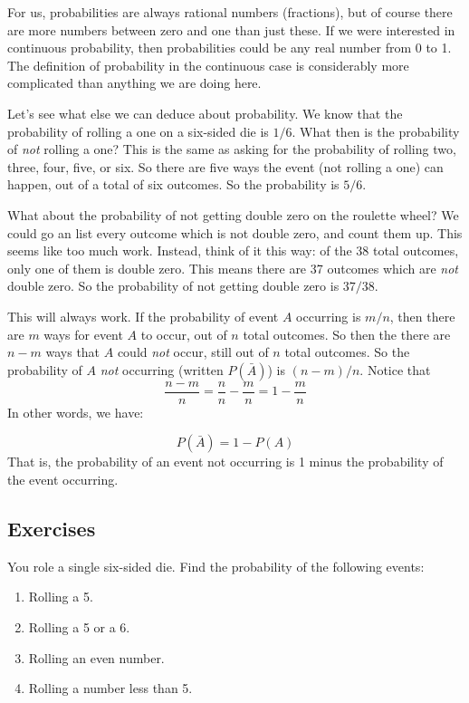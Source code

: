 \begin{remark}
 For us, probabilities are always rational numbers (fractions), but of course there are more numbers between zero and one than just these.  If we were interested in continuous probability, then probabilities could be any real number from 0 to 1.  The definition of probability in the continuous case is considerably more complicated than anything we are doing here.
\end{remark}

Let's see what else we can deduce about probability.  We know that the probability of rolling a one on a six-sided die is $1/6$.  What then is the probability of {\em not} rolling a one?  This is the same as asking for the probability of rolling two, three, four, five, or six.  So there are five ways the event (not rolling a one) can happen, out of a total of six outcomes.  So the probability is $5/6$.  

What about the probability of not getting double zero on the roulette wheel?  We could go an list every outcome which is not double zero, and count them up.  This seems like too much work.  Instead, think of it this way: of the 38 total outcomes, only one of them is double zero.  This means there are 37 outcomes which are {\em not} double zero.  So the probability of not getting double zero is $37/38$.  

This will always work.  If the probability of event $A$ occurring is $m/n$, then there are $m$ ways for event $A$ to occur, out of $n$ total outcomes.  So then the there are $n-m$ ways that $A$ could {\em not} occur, still out of $n$ total outcomes.  So the probability of $A$ {\em not} occurring (written $P(\bar A)$) is $(n-m)/n$.  Notice that
\[\frac{n-m}{n} = \frac{n}{n} - \frac{m}{n} = 1 - \frac{m}{n}\]
In other words, we have:

\begin{probfact}
 \[P(\bar A) = 1 - P(A)\]
That is, the probability of an event not occurring is 1 minus the probability of the event occurring.
\end{probfact}

\subsection{Exercises}

\begin{problem}
 You role a single six-sided die.  Find the probability of the following events:
\begin{enumerate}
 \item Rolling a 5.
\item Rolling a 5 or a 6.
\item Rolling an even number.
\item Rolling a number less than 5.
\end{enumerate}
\end{problem}

